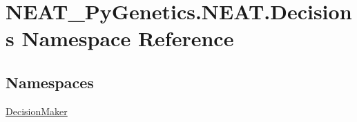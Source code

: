 \hypertarget{namespaceNEAT__PyGenetics_1_1NEAT_1_1Decisions}{}\section{N\+E\+A\+T\+\_\+\+Py\+Genetics.\+N\+E\+A\+T.\+Decisions Namespace Reference}
\label{namespaceNEAT__PyGenetics_1_1NEAT_1_1Decisions}
\subsection*{Namespaces}
\begin{DoxyCompactItemize}
\item 
 \hyperlink{namespaceNEAT__PyGenetics_1_1NEAT_1_1Decisions_1_1DecisionMaker}{Decision\+Maker}
\end{DoxyCompactItemize}
